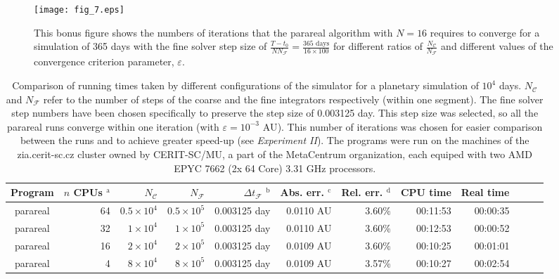 \documentclass[conference]{IEEEtran}
\begin{document}
\begin{figure}[htbp]
\centerline{\texttt{[image: fig\_7.eps]}}
\caption{This bonus figure shows the numbers of iterations that the parareal algorithm with $N = 16$ requires to converge for a simulation of 365 days with the fine solver step size of $\frac{T-t_0}{NN_\mathcal{F}} = \frac{365\text{ days}}{16\times100}$ for different ratios of $\frac{N_\mathcal{C}}{N_\mathcal{F}}$ and different values of the convergence criterion parameter, $\varepsilon$.}
\label{arraytest}
\end{figure}

\begin{table*}[htbp]
\caption{Comparison of running times taken by different configurations of the simulator for a planetary simulation of $10^4$ days.
$N_\mathcal{C}$ and $N_\mathcal{F}$ refer to the number of steps of the coarse and the fine integrators respectively (within one segment). The fine solver step numbers have been chosen specifically to preserve the step size of 0.003125 day. This step size was selected, so all the parareal runs converge within one iteration (with $\varepsilon = 10^{-3}\text{ AU}$). This number of iterations was chosen for easier comparison between the runs and to achieve greater speed-up (see \textit{Experiment II}).
The programs were run on the machines of the zia.cerit-sc.cz cluster owned by CERIT-SC/MU, a part of the MetaCentrum organization, each equiped with two AMD EPYC 7662 (2x 64 Core) 3.31 GHz processors.}
\begin{center}
\begin{tabular}{crrrrrrrrrcc}
\toprule
Program & $n$ CPUs $^{\mathrm{a}}$ & $N_\mathcal{C}$ & $N_\mathcal{F}$ & $\Delta t_\mathcal{F}$ $^{\mathrm{b}}$ & Abs. err. $^{\mathrm{c}}$ & Rel. err. $^{\mathrm{d}}$ & CPU time & Real time \\
\midrule
parareal & 64 & $0.5\times10^4$ &  $0.5\times10^5$ & 0.003125 day & 0.0110 AU & 3.60\% & 00:11:53 & 00:00:35 \\
parareal & 32 & $1\times10^4$ &  $1\times10^5$ & 0.003125 day & 0.0110 AU & 3.60\% & 00:12:53 & 00:00:52 \\
parareal & 16 & $2\times10^4$ &  $2\times10^5$ & 0.003125 day & 0.0109 AU & 3.60\% & 00:10:25 & 00:01:01 \\
parareal & 4 & $8\times10^4$ &  $8\times10^5$ & 0.003125 day & 0.0109 AU & 3.57\% & 00:10:27 & 00:02:54 \\

\end{tabular}
\end{center}
\end{table*}
\end{document}
